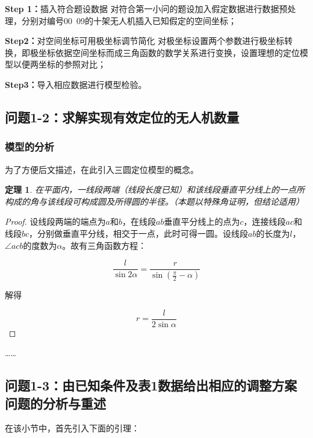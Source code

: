 \textbf{Step 1：}插入符合题设数据
对符合第一小问的题设加入假定数据进行数据预处理，分别对编号00~09的十架无人机插入已知假定的空间坐标；

\textbf{Step2：}对空间坐标可用极坐标调节简化
对极坐标设置两个参数进行极坐标转换，即极坐标依据空间坐标而成三角函数的数学关系进行变换，设置理想的定位模型以便两坐标的参照对比；\cite{wangnengbinShujukuxitongjiaocheng}


\textbf{Step3：}导入相应数据进行模型检验。


\subsection{问题1-2：求解实现有效定位的无人机数量}

\subsubsection{模型的分析}

为了方便后文描述，在此引入三圆定位模型的概念。

\newtheorem{mythm}{定理}[section]
\begin{mythm}
    在平面内，一线段两端（线段长度已知）和该线段垂直平分线上的一点所构成的角与该线段可构成圆及所得圆的半径。（本题以特殊角证明，但结论适用）
\end{mythm}

\begin{proof}
    设线段两端的端点为$a$和$b$，在线段$ab$垂直平分线上的点为$c$，连接线段$ac$和线段$bc$，分别做垂直平分线，相交于一点，此时可得一圆。设线段$ab$的长度为$l$，$\angle acb$的度数为$\alpha$。故有三角函数方程：

    \begin{equation}
        \frac{l}{\sin 2\alpha}=
        \frac{r}{\sin(\frac{\pi}{2}-\alpha)}
    \end{equation}

    解得

    \begin{equation}
        r=\frac{l}{2\sin\alpha}
    \end{equation}
\end{proof}

……


\subsection{问题1-3：由已知条件及表1数据给出相应的调整方案
问题的分析与重述}

在该小节中，首先引入下面的引理：

